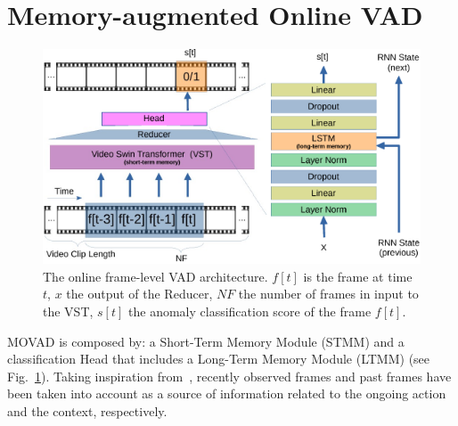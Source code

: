 \section{Memory-augmented Online VAD}
\label{sec:theory}

\fboxsep=1mm%
\fboxrule=1pt%

\begin{figure}[!t]
            \centerline{\includegraphics[clip, width=\linewidth]{images/arch-rx-cropped.pdf}}
        \caption{The online frame-level VAD architecture. $f[t]$ is the frame at time $t$, $x$ the output of the Reducer, $\mathit{NF}$ the number of frames in input to the VST, $s[t]$ the anomaly classification score of the frame $f[t]$.\label{fig:arch}}
\end{figure}

MOVAD is composed by: a Short-Term Memory Module (STMM) and a classification Head that includes a Long-Term Memory Module (LTMM) (see Fig.~\ref{fig:arch}). 
Taking inspiration from~\cite{xu2021long}, recently observed frames and past frames have been taken into account as a source of information related to the ongoing action and the context, respectively.

